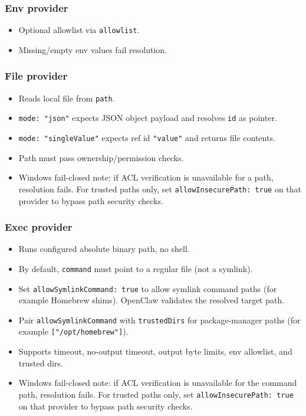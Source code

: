 \subsubsection{Env provider}


\begin{itemize}
  \item Optional allowlist via \texttt{allowlist}.
  \item Missing/empty env values fail resolution.
\end{itemize}


\subsubsection{File provider}


\begin{itemize}
  \item Reads local file from \texttt{path}.
  \item \texttt{mode: "json"} expects JSON object payload and resolves \texttt{id} as pointer.
  \item \texttt{mode: "singleValue"} expects ref id \texttt{"value"} and returns file contents.
  \item Path must pass ownership/permission checks.
  \item Windows fail-closed note: if ACL verification is unavailable for a path, resolution fails. For trusted paths only, set \texttt{allowInsecurePath: true} on that provider to bypass path security checks.
\end{itemize}


\subsubsection{Exec provider}


\begin{itemize}
  \item Runs configured absolute binary path, no shell.
  \item By default, \texttt{command} must point to a regular file (not a symlink).
  \item Set \texttt{allowSymlinkCommand: true} to allow symlink command paths (for example Homebrew shims). OpenClaw validates the resolved target path.
  \item Pair \texttt{allowSymlinkCommand} with \texttt{trustedDirs} for package-manager paths (for example \texttt{["/opt/homebrew"]}).
  \item Supports timeout, no-output timeout, output byte limits, env allowlist, and trusted dirs.
  \item Windows fail-closed note: if ACL verification is unavailable for the command path, resolution fails. For trusted paths only, set \texttt{allowInsecurePath: true} on that provider to bypass path security checks.
\end{itemize}



